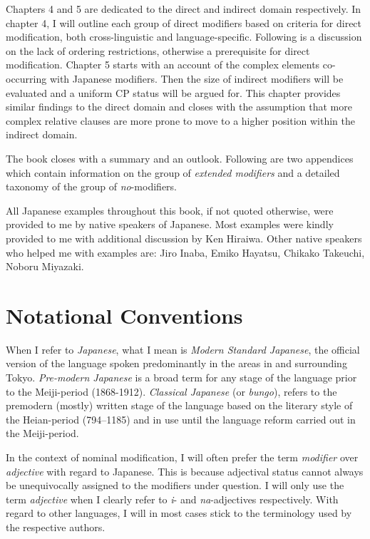 \documentclass [output=book,colorlinks,citecolor=brown]{langscibook}
\begin{document}
Chapters 4 and 5 are dedicated to the direct and indirect domain respectively. In chapter 4, I will outline each group of direct modifiers based on criteria for direct modification, both cross-linguistic and language-specific. Following is a discussion on the lack of ordering restrictions, otherwise a prerequisite for direct modification. Chapter 5 starts with an account of the complex elements co-occurring with Japanese modifiers. Then the size of indirect modifiers will be evaluated and a uniform CP status will be argued for. This chapter provides similar findings to the direct domain and closes with the assumption that more complex relative clauses are more prone to move to a higher position within the indirect domain.

The book closes with a summary and an outlook. Following are two appendices which contain information on the group of \textit{extended modifiers} and a detailed taxonomy of the group of \textit{no}-modifiers.

All Japanese examples throughout this book, if not quoted otherwise, were provided to me by native speakers of Japanese. Most examples were kindly provided to me with additional discussion by Ken Hiraiwa. Other native speakers who helped me with examples are: Jiro Inaba, Emiko Hayatsu, Chikako Takeuchi, Noboru Miyazaki.

\chapter*{Notational Conventions}

When I refer to \textit{Japanese}, what I mean is \textit{Modern Standard Japanese}, the official version of the language spoken predominantly in the areas in and surrounding Tokyo. \textit{Pre-modern Japanese} is a broad term for any stage of the language prior to the Meiji-period (1868-1912). \textit{Classical Japanese} (or \textit{bungo}), refers to the premodern (mostly) written stage of the language based on the literary style of the Heian-period (794–1185) and in use until the language reform carried out in the Meiji-period.

In the context of nominal modification, I will often prefer the term \textit{modifier} over \textit{adjective} with regard to Japanese. This is because adjectival status cannot always be unequivocally assigned to the modifiers under question. I will only use the term \textit{adjective} when I clearly refer to \textit{i}- and \textit{na}-adjectives respectively. With regard to other languages, I will in most cases stick to the terminology used by the respective authors.
\end{document}
